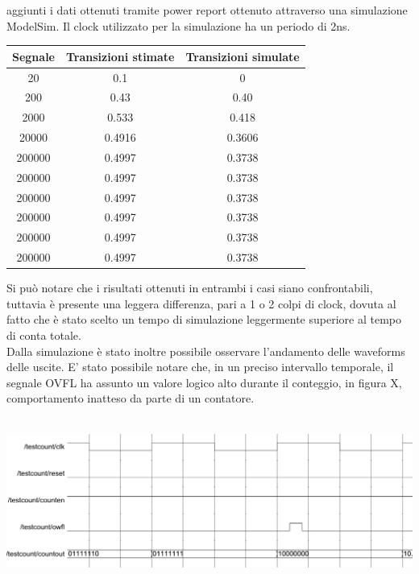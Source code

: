 \documentclass[10pt,  english, makeidx, a4paper, titlepage, oneside]{book}
\begin{document}
aggiunti i dati ottenuti tramite power report ottenuto attraverso 
una simulazione ModelSim. Il clock utilizzato per la simulazione ha un periodo
di 2ns.
\\
\begin{center}
	\begin{tabular}{|c|c|c|}
	\hline
	Segnale & Transizioni stimate & Transizioni simulate \\ 
	\hline
	20 & 0.1 & 0 \\
	\hline
	200 & 0.43 & 0.40\\
	\hline
	2000 & 0.533 & 0.418\\
	\hline
	20000 & 0.4916 & 0.3606\\
	\hline
	200000 & 0.4997 & 0.3738 \\
	\hline
	200000 & 0.4997 & 0.3738 \\
	\hline
	200000 & 0.4997 & 0.3738 \\
	\hline
	200000 & 0.4997 & 0.3738 \\
	\hline
	200000 & 0.4997 & 0.3738 \\
	\hline
	200000 & 0.4997 & 0.3738 \\
	\hline
	\end{tabular}
\end{center}
\vspace{0.3cm}
Si può notare che i risultati ottenuti in entrambi i casi siano
confrontabili, tuttavia è presente una leggera differenza, pari
a 1 o 2 colpi di clock, dovuta al fatto che è stato scelto un 
tempo di simulazione leggermente superiore al tempo di conta 
totale.
\\
Dalla simulazione è stato inoltre possibile osservare l'andamento 
delle waveforms delle uscite. E' stato possibile notare che, in
un preciso intervallo temporale, il segnale OVFL ha assunto un valore 
logico alto durante il conteggio, in figura X, comportamento inatteso da parte
di un contatore. 
\\\\
\centerline{\includegraphics[width=15cm]{./img/Lab_1/Es_5/Glitch.png}}
\\\\
\end{document}
